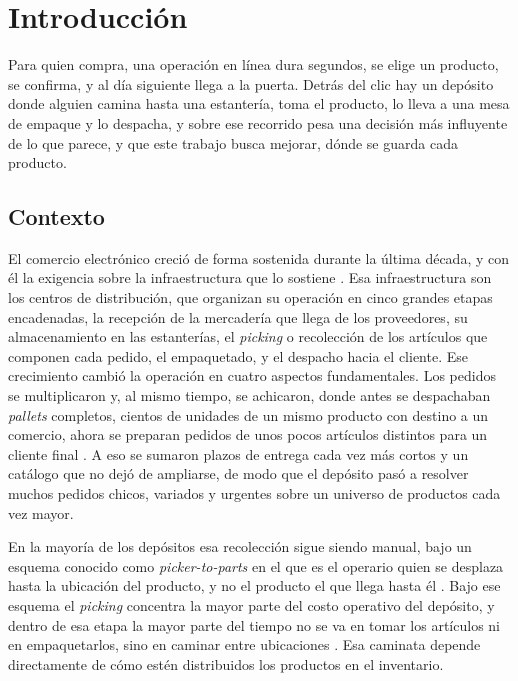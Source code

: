 \chapter{Introducción}
\label{chapter:intro}

Para quien compra, una operación en línea dura segundos, se elige un producto, se confirma, y al día siguiente llega a la puerta.
Detrás del clic hay un depósito donde alguien camina hasta una estantería, toma el producto, lo lleva a una mesa de empaque y lo despacha, y sobre ese recorrido pesa una decisión más influyente de lo que parece, y que este trabajo busca mejorar, dónde se guarda cada producto.

\section{Contexto}

El comercio electrónico creció de forma sostenida durante la última década, y con él la exigencia sobre la infraestructura que lo sostiene \citep{boysen2019warehousing}.
Esa infraestructura son los centros de distribución, que organizan su operación en cinco grandes etapas encadenadas, la recepción de la mercadería que llega de los proveedores, su almacenamiento en las estanterías, el \emph{picking} o recolección de los artículos que componen cada pedido, el empaquetado, y el despacho hacia el cliente.
Ese crecimiento cambió la operación en cuatro aspectos fundamentales.
Los pedidos se multiplicaron y, al mismo tiempo, se achicaron, donde antes se despachaban \emph{pallets} completos, cientos de unidades de un mismo producto con destino a un comercio, ahora se preparan pedidos de unos pocos artículos distintos para un cliente final \citep{boysen2019warehousing}.
A eso se sumaron plazos de entrega cada vez más cortos y un catálogo que no dejó de ampliarse, de modo que el depósito pasó a resolver muchos pedidos chicos, variados y urgentes sobre un universo de productos cada vez mayor.

En la mayoría de los depósitos esa recolección sigue siendo manual, bajo un esquema conocido como \emph{picker-to-parts} en el que es el operario quien se desplaza hasta la ubicación del producto, y no el producto el que llega hasta él \citep{dekoster2007design}.
Bajo ese esquema el \emph{picking} concentra la mayor parte del costo operativo del depósito, y dentro de esa etapa la mayor parte del tiempo no se va en tomar los artículos ni en empaquetarlos, sino en caminar entre ubicaciones \citep{dekoster2007design, tompkins2010facilities}.
Esa caminata depende directamente de cómo estén distribuidos los productos en el inventario.


